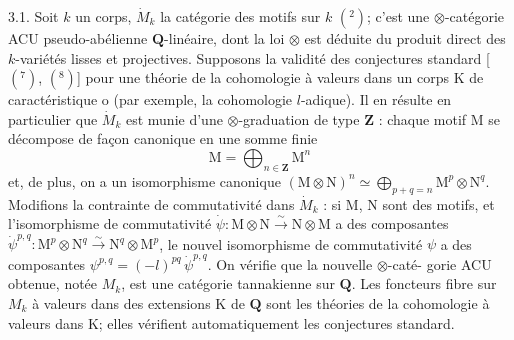 3.1. Soit $k$ un corps, $\dot{M}_k$ la catégorie des motifs sur $k$ $(^2)$; c'est une
$\otimes$-catégorie ACU pseudo-abélienne $\mathbf{Q}$-linéaire, dont la loi $\otimes$ est déduite
du produit direct des $k$-variétés lisses et projectives. Supposons la validité
des conjectures standard [$(^7)$, $(^8)$] pour une théorie de la cohomologie à
valeurs dans un corps K de caractéristique o (par exemple, la cohomologie
$l$-adique). Il en résulte en particulier que $\dot{M}_k$ est munie d'une $\otimes$-graduation
de type $\mathbf{Z}$ : chaque motif M se décompose de façon canonique en une somme
finie
\[ \mathrm{M} = \bigoplus_{n\in\mathbf{Z}} \mathrm{M}^n \]
et, de plus, on a un isomorphisme canonique $(\mathrm{M}\otimes\mathrm{N})^n \simeq \bigoplus_{p+q=n} \mathrm{M}^p\otimes\mathrm{N}^q$.
Modifions la contrainte de commutativité dans $\dot{M}_k$ : si M, N sont des motifs,
et l'isomorphisme de commutativité $\dot{\psi} : \mathrm{M}\otimes\mathrm{N} \xrightarrow{\sim} \mathrm{N}\otimes\mathrm{M}$ a des composantes
$\dot{\psi}^{p,q} : \mathrm{M}^p\otimes\mathrm{N}^q \xrightarrow{\sim} \mathrm{N}^q\otimes\mathrm{M}^p$, le nouvel isomorphisme de commutativité $\psi$
a des composantes $\psi^{p,q} = (-l)^{pq}\,\dot{\psi}^{p,q}$. On vérifie que la nouvelle $\otimes$-caté-%
gorie ACU obtenue, notée $M_k$, est une catégorie tannakienne sur $\mathbf{Q}$. Les
foncteurs fibre sur $M_k$ à valeurs dans des extensions K de $\mathbf{Q}$ sont les théories
de la cohomologie à valeurs dans K; elles vérifient automatiquement les
conjectures standard.

